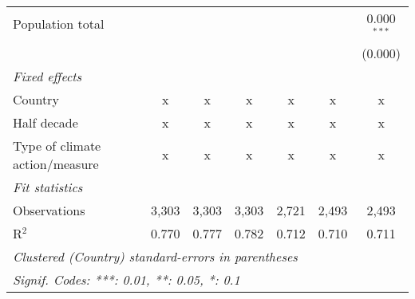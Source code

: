 \begin{tabular}{lcccccc}
   Population total                                              &         &               &               &                &                & 0.000$^{***}$\\   
                                                                 &         &               &               &                &                & (0.000)\\   
   \emph{Fixed effects}\\
   Country                                                       & x       & x             & x             & x              & x              & x\\  
   Half decade                                                   & x       & x             & x             & x              & x              & x\\  
   Type of climate action/measure                                & x       & x             & x             & x              & x              & x\\  
   \midrule \emph{Fit statistics}\\
   Observations                                                  & 3,303   & 3,303         & 3,303         & 2,721          & 2,493          & 2,493\\  
   R$^2$                                                         & 0.770   & 0.777         & 0.782         & 0.712          & 0.710          & 0.711\\  
   \midrule
   \multicolumn{7}{l}{\emph{Clustered (Country) standard-errors in parentheses}}\\
   \multicolumn{7}{l}{\emph{Signif. Codes: ***: 0.01, **: 0.05, *: 0.1}}\\
\end{tabular}
\par\endgroup


